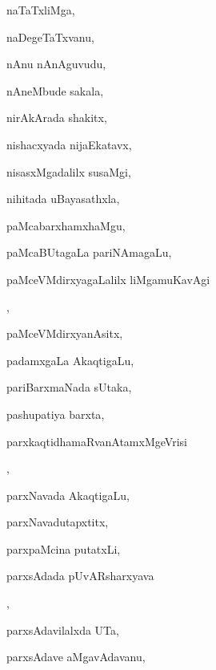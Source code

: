 \begin{multicols}{3}
{\noindent
{naTaTxliMga}, \pageref{naTaTxliMga}

\noindent
{naDegeTaTxvanu}, \pageref{naDegeTaTxvanu}

\noindent
{nAnu nAnAguvudu}, \pageref{nAnu nAnAguvudu}

\noindent
{nAneMbude sakala}, \pageref{nAneMbude sakala}

\noindent
{nirAkArada shakitx}, \pageref{nirAkArada shakitx}

\noindent
{nishacxyada nijaEkatavx}, \pageref{nishacxyada nijaEkatavx}

\noindent
{nisasxMgadalilx susaMgi}, \pageref{nisasxMgadalilx susaMgi}

\noindent
{nihitada uBayasathxla}, \pageref{nihitada uBayasathxla}

\noindent
{paMcabarxhamxhaMgu}, \pageref{paMcabarxhamxhaMgu}

\noindent
{paMcaBUtagaLa pariNAmagaLu}, \pageref{paMcaBUtagaLa pariNAmagaLu}

\noindent
{paMceVMdirxyagaLalilx liMgamuKavAgi}

\noindent
{}, \pageref{paMceVMdirxyagaLalilx liMgamuKavAgi koLuLxvudu}

\noindent
{paMceVMdirxyanAsitx}, \pageref{paMceVMdirxyanAsitx}

\noindent
{padamxgaLa AkaqtigaLu}, \pageref{padamxgaLa AkaqtigaLu}

\noindent
{pariBarxmaNada sUtaka}, \pageref{pariBarxmaNada sUtaka}

\noindent
{pashupatiya barxta}, \pageref{pashupatiya barxta}

\noindent
{parxkaqtidhamaRvanAtamxMgeVrisi}

\noindent
{}, \pageref{parxkaqtidhamaRvanAtamxMgeVrisi kAba jaDa}

\noindent
{parxNavada AkaqtigaLu}, \pageref{parxNavada AkaqtigaLu}

\noindent
{parxNavadutapxtitx}, \pageref{parxNavadutapxtitx}

\noindent
{parxpaMcina putatxLi}, \pageref{parxpaMcina putatxLi}

\noindent
{parxsAdada pUvARsharxyava}

\noindent
{}, \pageref{parxsAdada pUvARsharxyava kaLeyuvudu}

\noindent
{parxsAdavilalxda UTa}, \pageref{parxsAdavilalxda UTa}

\noindent
{parxsAdave aMgavAdavanu}, \pageref{parxsAdave aMgavAdavanu}

}
\end{multicols}
